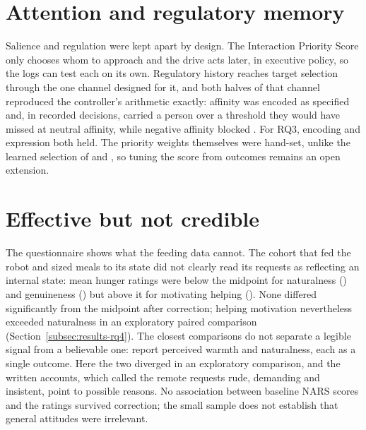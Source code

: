 \section{Attention and regulatory memory}
\label{sec:disc-salience}

Salience and regulation were kept apart by design. The Interaction Priority Score only chooses whom to approach and the drive acts later, in executive policy, so the logs can test each on its own. Regulatory history reaches target selection through the one channel designed for it, and both halves of that channel reproduced the controller's arithmetic exactly: affinity was encoded as specified and, in \CoreEnabledRecords{} recorded decisions, carried a person over a threshold they would have missed at neutral affinity, while negative affinity blocked \CoreRestrictedRecords{}. For RQ3, encoding and expression both held. The priority weights themselves were hand-set, unlike the learned selection of \citet{GarciaMartinez2025BioinspiredStimulus} and \citet{Ghamati2025LearningToGaze}, so tuning the score from outcomes remains an open extension.

\section{Effective but not credible}
\label{sec:disc-central-finding}

The questionnaire shows what the feeding data cannot. The cohort that fed the robot and sized meals to its state did not clearly read its requests as reflecting an internal state: mean hunger ratings were below the midpoint for naturalness (\CoreCustomHungerNaturalMean{}) and genuineness (\CoreCustomHungerGenuineMean{}) but above it for motivating helping (\CoreCustomHungerHelpingMean{}). None differed significantly from the midpoint after correction; helping motivation nevertheless exceeded naturalness in an exploratory paired comparison (Section~\ref{subsec:results-rq4}). The closest comparisons do not separate a legible signal from a believable one: \citet{Scheunemann2022IntrinsicallyMotivated} report perceived warmth and \citet{MarotoGomez2025RobotCompanion} naturalness, each as a single outcome. Here the two diverged in an exploratory comparison, and the written accounts, which called the remote requests rude, demanding and insistent, point to possible reasons. No association between baseline NARS scores and the ratings survived correction; the small sample does not establish that general attitudes were irrelevant.

